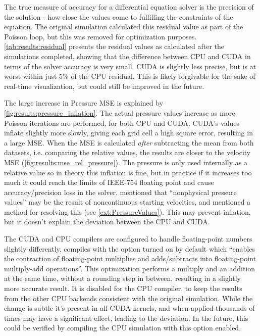 

The true measure of accuracy for a differential equation solver is the precision of the solution - how close the values come to fulfilling the constraints of the equation.
The original simulation calculated this residual value as part of the Poisson loop, but this was removed for optimization purposes.
\cref{tab:results:residual} presents the residual values as calculated after the simulations completed, showing that the difference between CPU and CUDA in terms of the solver accuracy is very small.
CUDA is slightly less precise, but is at worst within just 5\% of the CPU residual.
This is likely forgivable for the sake of real-time visualization, but could still be improved in the future.




The large increase in Pressure MSE is explained by \cref{fig:results:pressure_inflation}.
The actual pressure values increase as more Poisson iterations are performed, for both CPU and CUDA.
CUDA's values inflate slightly more slowly, giving each grid cell a high square error, resulting in a large MSE.
When the MSE is calculated \emph{after} subtracting the mean from both datasets, i.e. comparing the relative values, the results are closer to the velocity MSE (\cref{fig:results:mse_rel_pressure}).
The pressure is only used internally as a relative value so in theory this inflation is fine, but in practice if it increases too much it could reach the limits of IEEE-754 floating point\cite{IEEEFloat75419} and cause accuracy/precision loss in the solver.
\cite{book:griebel1998numerical} mentioned that ``nonphysical pressure values'' may be the result of noncontinuous starting velocities, and mentioned a method for resolving this (see \cref{ext:PressureValues}). This may prevent inflation, but it doesn't explain the deviation between the CPU and CUDA.

The CUDA and CPU compilers are configured to handle floating-point numbers slightly differently.
 compiles with the  option turned on by default\cite{NvccFmad} which ``enables the contraction of floating-point multiplies and adds/subtracts into floating-point multiply-add operations''.
This optimization performs a multiply and an addition at the same time, without a rounding step in between, resulting in a slightly more accurate result\cite{NvidiaFMAJustification}.
It is disabled for the CPU compiler, to keep the results from the other CPU backends consistent with the original simulation.
While the change is subtle it's present in all CUDA kernels, and when applied thousands of times may have a significant effect, leading to the deviation.
In the future, this could be verified by compiling the CPU simulation with this option enabled.

